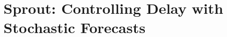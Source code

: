 \chapter{Sprout: Controlling Delay with Stochastic Forecasts}
\label{chap:sprout}

%




%





%
%
